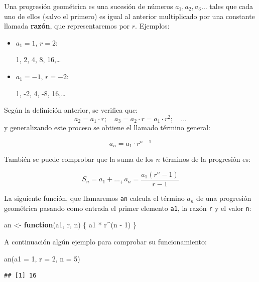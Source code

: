\documentclass[
]{book}
\newenvironment{Shaded}{\begin{snugshade}}{\end{snugshade}}
\newcommand{\AttributeTok}[1]{\textcolor[rgb]{0.77,0.63,0.00}{#1}}
\newcommand{\ControlFlowTok}[1]{\textcolor[rgb]{0.13,0.29,0.53}{\textbf{#1}}}
\newcommand{\DecValTok}[1]{\textcolor[rgb]{0.00,0.00,0.81}{#1}}
\newcommand{\FunctionTok}[1]{\textcolor[rgb]{0.00,0.00,0.00}{#1}}
\newcommand{\NormalTok}[1]{#1}
\newcommand{\OtherTok}[1]{\textcolor[rgb]{0.56,0.35,0.01}{#1}}
\newcommand{\SpecialCharTok}[1]{\textcolor[rgb]{0.00,0.00,0.00}{#1}}
\theoremstyle{break}
\theoremstyle{nonumberplain}
\begin{document}
Una progresión geométrica es una sucesión de números \(a_1, a_2, a_3\ldots\)
tales que cada uno de ellos (salvo el primero) es igual al anterior
multiplicado por una constante llamada \textbf{razón}, que representaremos
por \(r\). Ejemplos:

\begin{itemize}
\item
  \(a_1=1\), \(r=2\):

  1, 2, 4, 8, 16,\ldots{}
\item
  \(a_1=-1\), \(r=-2\):

  1, -2, 4, -8, 16,\ldots{}
\end{itemize}

Según la definición anterior, se verifica que:
\[a_2=a_1\cdot r; \quad a_3=a_2\cdot r=a_1\cdot r^2; \quad ...\] y
generalizando este proceso se obtiene el llamado término general:

\[a_n=a_1\cdot r^{n-1}\]

También se puede comprobar que la suma de los \(n\) términos de la
progresión es:

\[S_n=a_1+\ldots_+a_n=\frac{a_1(r^n-1)}{r-1}\]

La siguiente función, que llamaremos \texttt{an} calcula el término
\(a_n\) de una progresión geométrica pasando como entrada el primer
elemento \texttt{a1}, la razón \texttt{r} y el valor \texttt{n}:

\begin{Shaded}
\begin{Highlighting}[]
\NormalTok{an }\OtherTok{\textless{}{-}} \ControlFlowTok{function}\NormalTok{(a1, r, n) \{}
\NormalTok{        a1 }\SpecialCharTok{*}\NormalTok{ r}\SpecialCharTok{\^{}}\NormalTok{(n }\SpecialCharTok{{-}} \DecValTok{1}\NormalTok{)}
\NormalTok{      \}}
\end{Highlighting}
\end{Shaded}

A continuación algún ejemplo para comprobar su funcionamiento:

\begin{Shaded}
\begin{Highlighting}[]
\FunctionTok{an}\NormalTok{(}\AttributeTok{a1 =} \DecValTok{1}\NormalTok{, }\AttributeTok{r =} \DecValTok{2}\NormalTok{, }\AttributeTok{n =} \DecValTok{5}\NormalTok{)}
\end{Highlighting}
\end{Shaded}

\begin{verbatim}
## [1] 16
\end{verbatim}
\end{document}
